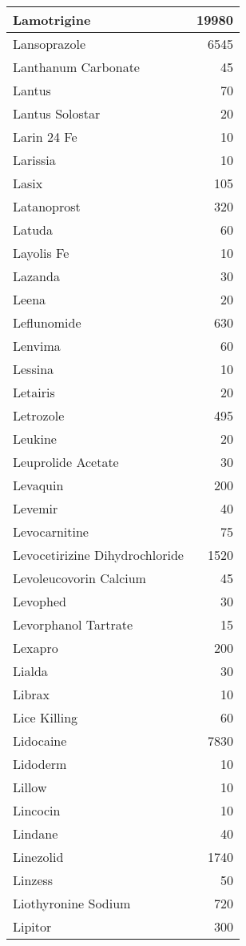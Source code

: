 \documentclass[
]{article}
\begin{document}
\begin{table}
\begin{tabular}[t]{l|r}
\hline
Lamotrigine & 19980\\
\hline
Lansoprazole & 6545\\
\hline
Lanthanum Carbonate & 45\\
\hline
Lantus & 70\\
\hline
Lantus Solostar & 20\\
\hline
Larin 24 Fe & 10\\
\hline
Larissia & 10\\
\hline
Lasix & 105\\
\hline
Latanoprost & 320\\
\hline
Latuda & 60\\
\hline
Layolis Fe & 10\\
\hline
Lazanda & 30\\
\hline
Leena & 20\\
\hline
Leflunomide & 630\\
\hline
Lenvima & 60\\
\hline
Lessina & 10\\
\hline
Letairis & 20\\
\hline
Letrozole & 495\\
\hline
Leukine & 20\\
\hline
Leuprolide Acetate & 30\\
\hline
Levaquin & 200\\
\hline
Levemir & 40\\
\hline
Levocarnitine & 75\\
\hline
Levocetirizine Dihydrochloride & 1520\\
\hline
Levoleucovorin Calcium & 45\\
\hline
Levophed & 30\\
\hline
Levorphanol Tartrate & 15\\
\hline
Lexapro & 200\\
\hline
Lialda & 30\\
\hline
Librax & 10\\
\hline
Lice Killing & 60\\
\hline
Lidocaine & 7830\\
\hline
Lidoderm & 10\\
\hline
Lillow & 10\\
\hline
Lincocin & 10\\
\hline
Lindane & 40\\
\hline
Linezolid & 1740\\
\hline
Linzess & 50\\
\hline
Liothyronine Sodium & 720\\
\hline
Lipitor & 300\\

\end{tabular}
\end{table}
\end{document}
